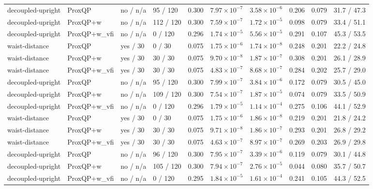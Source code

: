 \begin{tabular}{llllllllll}
decoupled-upright & ProxQP & no / n/a & 95 / 120 & 0.300 & $7.97\times 10^{-7}$ & $3.58\times 10^{-6}$ & 0.206 & 0.079 & 31.7 / 47.3 \\
decoupled-upright & ProxQP+w & no / n/a & 112 / 120 & 0.300 & $7.59\times 10^{-7}$ & $1.72\times 10^{-5}$ & 0.098 & 0.079 & 33.4 / 51.1 \\
decoupled-upright & ProxQP+w\_vfi & no / n/a & 0 / 120 & 0.296 & $1.74\times 10^{-5}$ & $5.56\times 10^{-5}$ & 0.291 & 0.107 & 45.3 / 53.5 \\
waist-distance & ProxQP & yes / 30 & 0 / 30 & 0.075 & $1.75\times 10^{-6}$ & $1.74\times 10^{-8}$ & 0.248 & 0.201 & 22.2 / 24.8 \\
waist-distance & ProxQP+w & yes / 30 & 30 / 30 & 0.075 & $9.70\times 10^{-8}$ & $1.87\times 10^{-7}$ & 0.308 & 0.201 & 26.1 / 28.9 \\
waist-distance & ProxQP+w\_vfi & yes / 30 & 30 / 30 & 0.075 & $4.83\times 10^{-7}$ & $8.68\times 10^{-7}$ & 0.284 & 0.202 & 25.7 / 29.0 \\
decoupled-upright & ProxQP & no / n/a & 95 / 120 & 0.300 & $7.99\times 10^{-7}$ & $3.84\times 10^{-6}$ & 0.172 & 0.079 & 30.5 / 45.0 \\
decoupled-upright & ProxQP+w & no / n/a & 109 / 120 & 0.300 & $7.54\times 10^{-7}$ & $1.87\times 10^{-5}$ & 0.074 & 0.079 & 33.5 / 50.9 \\
decoupled-upright & ProxQP+w\_vfi & no / n/a & 0 / 120 & 0.296 & $1.79\times 10^{-5}$ & $1.14\times 10^{-4}$ & 0.275 & 0.106 & 44.1 / 52.9 \\
waist-distance & ProxQP & yes / 30 & 0 / 30 & 0.075 & $1.75\times 10^{-6}$ & $1.86\times 10^{-8}$ & 0.219 & 0.201 & 21.8 / 24.2 \\
waist-distance & ProxQP+w & yes / 30 & 30 / 30 & 0.075 & $9.71\times 10^{-8}$ & $1.86\times 10^{-7}$ & 0.293 & 0.201 & 26.8 / 29.2 \\
waist-distance & ProxQP+w\_vfi & yes / 30 & 30 / 30 & 0.075 & $4.63\times 10^{-7}$ & $8.97\times 10^{-7}$ & 0.269 & 0.203 & 26.9 / 29.8 \\
decoupled-upright & ProxQP & no / n/a & 96 / 120 & 0.300 & $7.95\times 10^{-7}$ & $3.39\times 10^{-6}$ & 0.119 & 0.079 & 30.1 / 44.8 \\
decoupled-upright & ProxQP+w & no / n/a & 105 / 120 & 0.300 & $7.94\times 10^{-7}$ & $2.76\times 10^{-5}$ & 0.044 & 0.080 & 35.7 / 50.7 \\
decoupled-upright & ProxQP+w\_vfi & no / n/a & 0 / 120 & 0.295 & $1.84\times 10^{-5}$ & $1.61\times 10^{-4}$ & 0.241 & 0.105 & 44.3 / 52.5 \\

\end{tabular}
